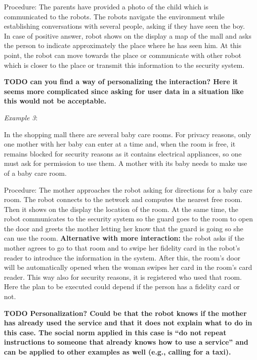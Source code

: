 Procedure: 
The parents have provided a photo of the child which is communicated to the robots. The robots navigate the environment while establishing conversations with several people, asking if they have seen the boy. In case of positive answer, robot shows on the display a map of the mall and asks the person to indicate approximately the place where he has seen him. At this point, the robot can move towards the place or communicate with other robot which is closer to the place or transmit this information to the security system.


{\bf TODO can you find a way of personalizing the interaction? Here it seems more complicated since asking for user data in a situation like this would not be acceptable.}



\textit{Example 3}:
 
In the shopping mall there are several baby care rooms. For privacy reasons, only one mother with her baby can enter at a time and, when the room is free, it remains blocked for security reasons as it contains electrical appliances, so one must ask for permission to use them. 
A mother with its baby needs to make use of a baby care room.

Procedure: 
The mother approaches the robot asking for directions for a baby care room. The robot connects to the network and computes the nearest free room. Then it shows on the display the location of the room. At the same time, the robot communicates to the security system so the guard goes to the room to open the door and greets the mother letting her know that the guard is going so she can use the room. \textbf{Alternative with more interaction:} the robot asks if the mother agrees to go to that room and to swipe her fidelity card in the robot's reader to introduce the information in the system. After this, the room's door will be automatically opened when the woman swipes her card in the room's card reader. This way also for security reasons, it is registered who used that room.
{\color{blue} Here the plan to be executed could depend if the person has a fidelity card or not.}


{\bf TODO Personalization? Could be that the robot knows if the mother has already used the service and that it does not explain what to do in this case. The social norm applied in this case is ``do not repeat instructions to someone that already knows how to use a service''
and can be applied to other examples as well (e.g., calling for a taxi).}








